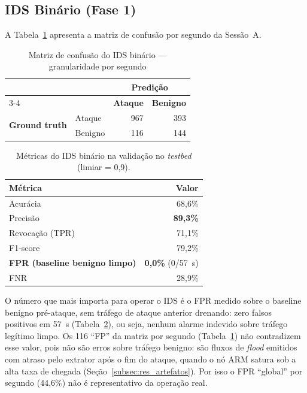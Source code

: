 \documentclass[12pt]{article}
\begin{document}
\subsection{IDS Binário (Fase 1)}
\label{subsec:res_bin}

A Tabela~\ref{tab:bin_cm} apresenta a matriz de confusão por segundo da Sessão~A.

\begin{table}[ht]
\centering
\caption{Matriz de confusão do IDS binário — granularidade por segundo}
\label{tab:bin_cm}
\begin{tabular}{@{}llrr@{}}
\toprule
& & \multicolumn{2}{c}{\textbf{Predição}} \\
\cmidrule{3-4}
& & \textbf{Ataque} & \textbf{Benigno} \\ \midrule
\multirow{2}{*}{\textbf{Ground truth}}
  & Ataque & 967 & 393 \\
  & Benigno & 116 & 144 \\ \bottomrule
\end{tabular}
\end{table}

\begin{table}[ht]
\centering
\caption{Métricas do IDS binário na validação no \textit{testbed} (limiar = 0,9).}
\label{tab:bin_metrics}
\begin{tabular}{@{}lr@{}}
\toprule
\textbf{Métrica} & \textbf{Valor} \\ \midrule
Acurácia          & 68,6\% \\
Precisão          & \textbf{89,3\%} \\
Revocação (TPR)   & 71,1\% \\
F1-score          & 79,2\% \\
\textbf{FPR (baseline benigno limpo)} & \textbf{0,0\%} (0/57~s) \\
FNR               & 28,9\% \\ \bottomrule
\end{tabular}
\end{table}

O número que mais importa para operar o IDS é o FPR medido sobre o baseline
benigno pré-ataque, sem tráfego de ataque anterior drenando: zero falsos
positivos em 57~s (Tabela~\ref{tab:bin_metrics}), ou seja, nenhum alarme indevido
sobre tráfego legítimo limpo. Os 116 ``FP'' da matriz por segundo
(Tabela~\ref{tab:bin_cm}) não contradizem esse valor, pois não são erros sobre
tráfego benigno: são fluxos de \textit{flood} emitidos com atraso pelo extrator
após o fim do ataque, quando o nó ARM satura sob a alta taxa de chegada
(Seção~\ref{subsec:res_artefatos}). Por isso o FPR ``global'' por segundo
(44,6\%) não é representativo da operação real.
\end{document}
